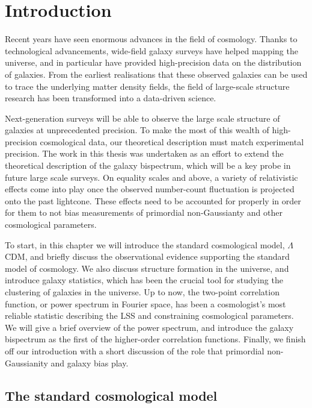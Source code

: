 
\chapter{Introduction}
\label{chapter:introgen}

Recent years have seen enormous advances in the field of cosmology. Thanks to technological advancements, wide-field galaxy surveys have helped mapping the universe, and in particular have provided high-precision data on the distribution of galaxies. From the earliest realisations that these observed galaxies can be used to trace the underlying matter density fields, the field of large-scale structure research has been transformed into a data-driven science. 

Next-generation surveys will be able to observe the large scale structure of galaxies at unprecedented precision. To make the most of this wealth of high-precision cosmological data, our theoretical description must match experimental precision. The work in this thesis was undertaken as an effort to extend the theoretical description of the galaxy bispectrum, which will be a key probe in future large scale surveys. On equality scales and above, a variety of relativistic effects come into play once the observed number-count fluctuation is projected onto the past lightcone. These effects need to be accounted for properly in order for them to not bias measurements of primordial non-Gaussianty and other cosmological parameters.

To start, in this chapter we will introduce the standard cosmological model, $\Lambda$CDM, and briefly discuss the observational evidence supporting the standard model of cosmology. We also discuss structure formation in the universe, and introduce galaxy statistics, which has been the crucial tool for studying the clustering of galaxies in the universe. Up to now, the two-point correlation function, or power spectrum in Fourier space, has been a cosmologist's most reliable statistic describing the LSS and constraining cosmological parameters. We will give a brief overview of the power spectrum, and introduce the galaxy bispectrum as the first of the higher-order correlation functions. Finally, we finish off our introduction with a short discussion of the role that primordial non-Gaussianity and galaxy bias play. 

\section{The standard cosmological model}

